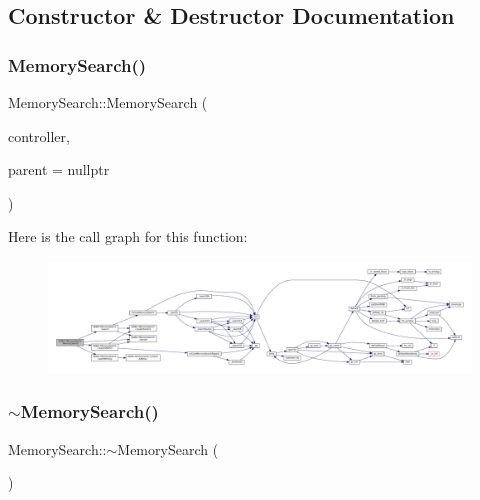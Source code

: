\subsection{Constructor \& Destructor Documentation}
\mbox{\label{class_q_g_b_a_1_1_memory_search_a34dd4edf1e3098dd7edcd635c077c218}} 
\subsubsection{\texorpdfstring{Memory\+Search()}{MemorySearch()}}
{\footnotesize\ttfamily Memory\+Search\+::\+Memory\+Search (\begin{DoxyParamCaption}\item[{std\+::shared\+\_\+ptr$<$ \mbox{\hyperlink{class_q_g_b_a_1_1_core_controller}{Core\+Controller}} $>$}]{controller,  }\item[{Q\+Widget $\ast$}]{parent = {\ttfamily nullptr} }\end{DoxyParamCaption})}

Here is the call graph for this function\+:
\nopagebreak
\begin{figure}[H]
\begin{center}
\leavevmode
\includegraphics[width=350pt]{class_q_g_b_a_1_1_memory_search_a34dd4edf1e3098dd7edcd635c077c218_cgraph}
\end{center}
\end{figure}
\mbox{\label{class_q_g_b_a_1_1_memory_search_af0f49e564aa65d3c83be4214663d8341}} 
\subsubsection{\texorpdfstring{$\sim$\+Memory\+Search()}{~MemorySearch()}}
{\footnotesize\ttfamily Memory\+Search\+::$\sim$\+Memory\+Search (\begin{DoxyParamCaption}{ }\end{DoxyParamCaption})}



